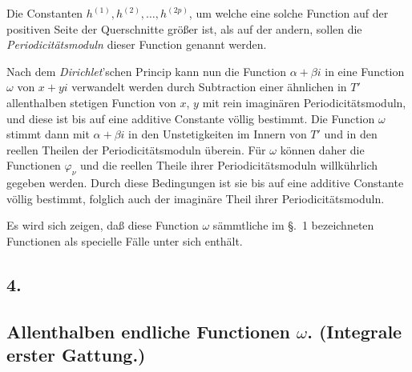 \documentclass{article}
\begin{document}
Die Constanten $h^{(1)}, h^{(2)}, \ldots, h^{(2p)}$, um welche eine solche Function auf der positiven Seite der Querschnitte größer ist, als auf der andern, sollen die \emph{Periodicitätsmoduln} dieser Function genannt werden.

Nach dem \emph{Dirichlet}'schen Princip kann nun die Function $\alpha + \beta i$ in eine Function $\omega$ von $x + yi$ verwandelt werden durch Subtraction einer ähnlichen in $T'$ allenthalben stetigen Function von $x$, $y$ mit rein imaginären Periodicitätsmoduln, und diese ist bis auf eine additive Constante völlig bestimmt. Die Function $\omega$ stimmt dann mit $\alpha + \beta i$ in den Unstetigkeiten im Innern von $T'$ und in den reellen Theilen der Periodicitätsmoduln überein. Für $\omega$ können daher die Functionen $\varphi_{\nu}$ und die reellen Theile ihrer Periodicitätsmoduln willkührlich gegeben werden. Durch diese Bedingungen ist sie bis auf eine additive Constante völlig bestimmt, folglich auch der imaginäre Theil ihrer Periodicitätsmoduln.

Es wird sich zeigen, daß diese Function $\omega$ sämmtliche im §.~1 bezeichneten Functionen als specielle Fälle unter sich enthält.

\subsection*{4.}

\subsection*{Allenthalben endliche Functionen $\omega$. (Integrale erster Gattung.)}
\end{document}

